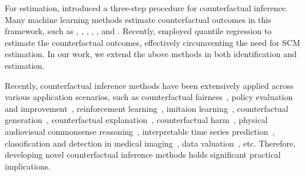 
 For estimation, \citet{Pearl-etal2016-primer}  introduced a three-step procedure for counterfactual inference. Many machine learning methods estimate counterfactual outcomes in this framework, such as  \citet{Lu-etal2020-attribution}, \citet{Mesnard2021-ICML}, \citet{Brouwer2022}, \citet{Shah2022}, \citet{Yan2023}, \citet{Nasr-Esfahany-2023-attribution} and \citet{Chao-etal2023}. 
 Recently, \citet{Xie-etal2023-attribution} employed quantile regression to estimate the counterfactual outcomes,  effectively circumventing the need for SCM estimation. 
 In our work, we extend the above methods in both identification and estimation. 


Recently, counterfactual inference methods have been extensively applied across various application scenarios,
   such as counterfactual fairness~\citep{kusner2017counterfactual, Zuo2023, Anthis2023-NIPS, Kavouras2023-NIPS, Chen2023-NIPS}, policy evaluation and improvement~\citep{Tang2023-NIPS, Saveski2023-NIPS, Chen-etal2023-NIPS}, reinforcement learning~\citep{Lu-etal2020-attribution, Tsirtsis2023-NIPS, Liu2023-NIPS, Shao2023-NIPS, Meulemans-etal-NIPS23, Haugh-ICML23, Zenati-ICML23}, imitaion learning~\citep{Sun2023-NIPS}, counterfactual generation~\citep{Yan2023, Prabhu2023-NIPS, Feder2023-NIPS, Ribeiro-ICML23}, counterfactual explanation~\citep{Kenny2023-NIPS, Raman2023-NIPS, Hamman-ICML23, Wu-eatl-ICML23, Ley-ICML23}, counterfactual harm~\citep{2022counterfactualharm, li2023trustworthy}, physical audiovisual commonsense reasoning~\citep{Lv2023-NIPS}, interpretable time series prediction~\citep{Yan-etal-ICML23},  classification and detection in medical imaging~\citep{Fontanella-ICML23}, data valuation~\citep{Liu-ICML23}, etc. 
   Therefore, developing novel counterfactual inference methods holds significant practical implications. 

